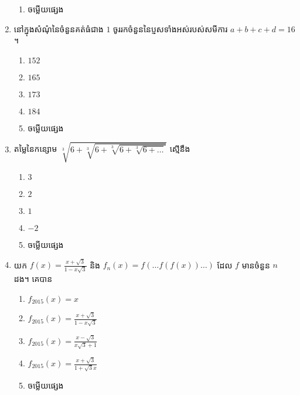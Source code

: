 \documentclass[12pt, a4paper]{article}
\begin{document}
\begin{enumerate}[m]
\begin{enumerate}[k,5]
		\item ចម្លើយផ្សេង
	\end{enumerate}
	{\color{blue}\hrulefill}
	\item នៅក្នុងសំណុំនៃចំនួនគត់ធំជាង $1$ ចូររកចំនួននៃប្ញសទាំងអស់របស់សមីការ $a+b+c+d=16$ ។
	\begin{enumerate}[k,5]
		\item $152$
		\item $165$
		\item $173$
		\item $184$
		\item ចម្លើយផ្សេង
	\end{enumerate}
	{\color{blue}\hrulefill}
	\item តម្លៃនៃកន្សោម $\sqrt[3]{6+\sqrt[3]{6+\sqrt[3]{6+\sqrt[3]{6+\dots}}}}$ ស្មើនឹង
	\begin{enumerate}[k,5]
		\item $3$
		\item $2$
		\item $1$
		\item $-2$
		\item ចម្លើយផ្សេង
	\end{enumerate}
	{\color{blue}\hrulefill}
	\item យក $f(x)=\frac{x+\sqrt{3}}{1-x\sqrt{3}}$ និង $f_n(x)=f\left(\dots f\left(f\left(x\right)\right)\dots\right)$ ដែល $f$ មានចំនួន $n$ ដង។ គេបាន
	\begin{enumerate}[k,3]
		\item $f_{2015}\left(x\right)=x$
		\item $f_{2015}\left(x\right)=\frac{x+\sqrt{3}}{1-x\sqrt{3}}$
		\item $f_{2015}\left(x\right)=\frac{x-\sqrt{3}}{x\sqrt{3}+1}$
		\item $f_{2015}\left(x\right)=\frac{x+\sqrt{3}}{1+\sqrt{3}x}$
		\item ចម្លើយផ្សេង
	\end{enumerate}
	{\color{blue}\hrulefill}
\end{enumerate}
\makeads
\newpage
\maketitle\koc
{\color{blue}\hrulefill}
\end{document}
